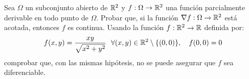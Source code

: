 \begin{ejercicio}
    Sea $\Omega$ un subconjunto abierto de $\mathbb{R}^2$ y $f:\Omega\to \mathbb{R}^2$ una función parcialmente derivable en todo punto de $\Omega$. Probar que, si la función $\nabla f :\Omega\to \mathbb{R}^2$ está acotada, entonces $f$ es continua. Usando la función $f:\mathbb{R}^2\to \mathbb{R}$ definida por:
    \begin{equation*}
        f(x,y) = \frac{xy}{\sqrt{x^2+y^2}}~~\forall (x,y)\in \mathbb{R}^2\setminus \{(0,0)\}, \quad f(0,0)=0
    \end{equation*}
    comprobar que, con las mismas hipótesis, no se puede asegurar que $f$ sea diferenciable.\\
\end{ejercicio}
